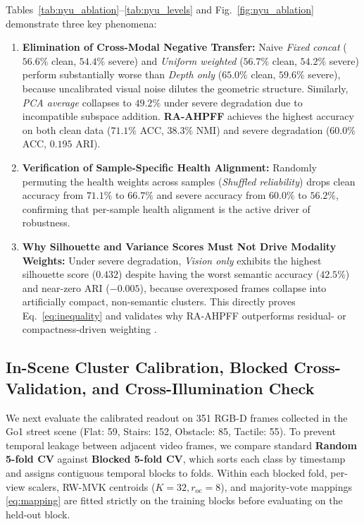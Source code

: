 \documentclass[11pt, a4paper]{article}
\begin{document}
Tables~\ref{tab:nyu_ablation}--\ref{tab:nyu_levels} and Fig.~\ref{fig:nyu_ablation} demonstrate three key phenomena:
\begin{enumerate}
    \item \textbf{Elimination of Cross-Modal Negative Transfer:} Naive \textit{Fixed concat} ($56.6\%$ clean, $54.4\%$ severe) and \textit{Uniform weighted} ($56.7\%$ clean, $54.2\%$ severe) perform substantially worse than \textit{Depth only} ($65.0\%$ clean, $59.6\%$ severe), because uncalibrated visual noise dilutes the geometric structure. Similarly, \textit{PCA average} collapses to $49.2\%$ under severe degradation due to incompatible subspace addition. \textbf{RA-AHPFF} achieves the highest accuracy on both clean data ($71.1\%$ ACC, $38.3\%$ NMI) and severe degradation ($60.0\%$ ACC, $0.195$ ARI).
    \item \textbf{Verification of Sample-Specific Health Alignment:} Randomly permuting the health weights across samples (\textit{Shuffled reliability}) drops clean accuracy from $71.1\%$ to $66.7\%$ and severe accuracy from $60.0\%$ to $56.2\%$, confirming that per-sample health alignment is the active driver of robustness.
    \item \textbf{Why Silhouette and Variance Scores Must Not Drive Modality Weights:} Under severe degradation, \textit{Vision only} exhibits the highest silhouette score ($0.432$) despite having the worst semantic accuracy ($42.5\%$) and near-zero ARI ($-0.005$), because overexposed frames collapse into artificially compact, non-semantic clusters. This directly proves Eq.~\eqref{eq:inequality} and validates why RA-AHPFF outperforms residual- or compactness-driven weighting \cite{hu2022view, yang2025deep}.
\end{enumerate}

\subsection{In-Scene Cluster Calibration, Blocked Cross-Validation, and Cross-Illumination Check}
\label{subsec:go1_cluster}
We next evaluate the calibrated readout on 351 RGB-D frames collected in the Go1 street scene (Flat: 59, Stairs: 152, Obstacle: 85, Tactile: 55). To prevent temporal leakage between adjacent video frames, we compare standard \textbf{Random 5-fold CV} against \textbf{Blocked 5-fold CV}, which sorts each class by timestamp and assigns contiguous temporal blocks to folds. Within each blocked fold, per-view scalers, RW-MVK centroids ($K=32, r_{\text{oc}}=8$), and majority-vote mappings \eqref{eq:mapping} are fitted strictly on the training blocks before evaluating on the held-out block.
\end{document}
